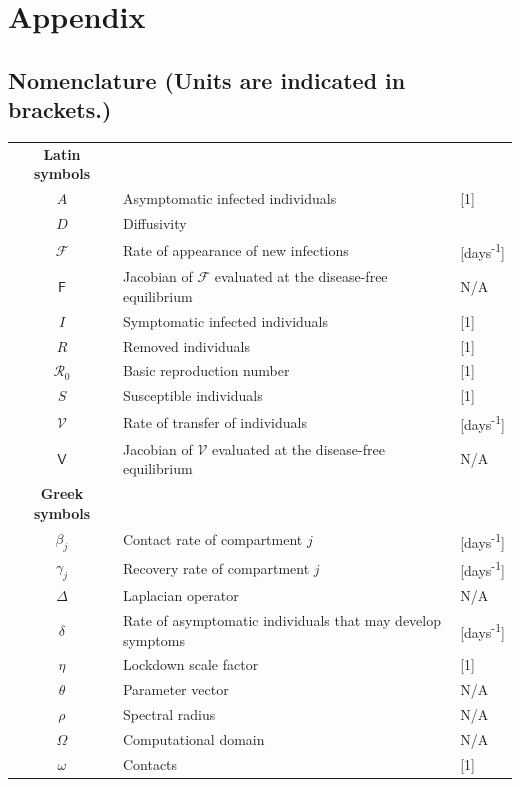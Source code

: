 \documentclass[11pt]{article}
\newcommand{\Ro}{\mathcal{R}_0}
\newcommand{\mat}[1]{\mathsf{#1}}
\begin{document}
\section*{Appendix}
	\subsection*{Nomenclature (Units are indicated in brackets.)}
		\begin{longtable}{c l l}
			\textbf{Latin symbols} & & \\
			$A$ & Asymptomatic infected individuals & [1] \\
			$D$ & Diffusivity & \\
			$\mathcal{F}$ & Rate of appearance of new infections & [days\textsuperscript{-1}] \\
			$\mat{F}$ & Jacobian of $\mathcal{F}$ evaluated at the disease-free equilibrium & N/A \\
			$I$ & Symptomatic infected individuals & [1] \\
			$R$ & Removed individuals & [1] \\
			$\Ro$ & Basic reproduction number & [1] \\
			$S$ & Susceptible individuals & [1] \\
			$\mathcal{V}$ & Rate of transfer of individuals & [days\textsuperscript{-1}] \\
			$\mat{V}$ & Jacobian of $\mathcal{V}$ evaluated at the disease-free equilibrium & N/A \\
			\textbf{Greek symbols} & & \\
			$\beta_j$ & Contact rate of compartment $j$ & [days\textsuperscript{-1}] \\
			$\gamma_j$ & Recovery rate of compartment $j$ & [days\textsuperscript{-1}] \\
			$\Delta$ & Laplacian operator & N/A \\
			$\delta$ & Rate of asymptomatic individuals that may develop symptoms & [days\textsuperscript{-1}] \\
			$\eta$ & Lockdown scale factor & [1] \\
			$\theta$ & Parameter vector & N/A \\
			$\rho$ & Spectral radius & N/A \\
			$\Omega$ & Computational domain & N/A \\
			$\omega$ & Contacts & [1]
		\end{longtable}
	
	\newpage
\end{document}
